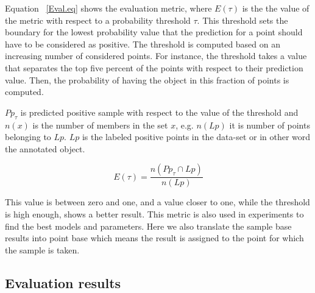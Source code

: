 Equation ~\ref{Eval.eq} shows the evaluation metric, where $E(\tau)$ is the the value of the metric with respect to a 
probability threshold $\tau$. 
This threshold sets the boundary for the lowest probability value that the prediction for a point should have to be 
considered as positive. 
The threshold is computed based on an increasing number of considered points.
For instance, the threshold takes a value that separates the top five percent of the points with respect to their prediction 
value.
Then, the probability of having the object in this fraction of points is computed.


$Pp_{\tau}$ is predicted positive sample with respect to the value of the threshold and $n(x)$ is the number of 
members in the set $x$, e.g. $n(Lp)$ it is number of points belonging to $Lp$. $Lp$ is the 
labeled positive points in the data-set or in other word the annotated object.

\begin{equation}
 \label{Eval.eq}
    E(\tau) = \frac{n({Pp_{\tau}} \cap {Lp})}{n(Lp)} 
\end{equation}

This value is between zero and one, and a value closer to one, while the threshold is high enough, shows a better result.
This metric is also used in experiments to find the best models and parameters. 
Here we also translate the sample base results into point base which means the result is assigned to the point for which 
the sample is taken.



\subsection{Evaluation results}
\label{EvaluationResult.ssec}

